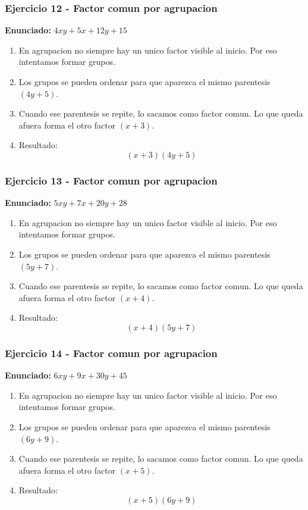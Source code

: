 \documentclass[11pt,a4paper]{article}
\begin{document}
\vspace{0.2cm}
\subsubsection*{Ejercicio 12 - Factor comun por agrupacion}
\textbf{Enunciado:} $ 4 x y + 5 x + 12 y + 15 $\par
\begin{enumerate}[leftmargin=2em]
\item En agrupacion no siempre hay un unico factor visible al inicio. Por eso intentamos formar grupos.
\item Los grupos se pueden ordenar para que aparezca el mismo parentesis \((4 y + 5)\).
\item Cuando ese parentesis se repite, lo sacamos como factor comun. Lo que queda afuera forma el otro factor \((x + 3)\).
\item Resultado: \[\boxed{\left(x + 3\right)\left(4 y + 5\right)}\]
\end{enumerate}

\vspace{0.2cm}
\subsubsection*{Ejercicio 13 - Factor comun por agrupacion}
\textbf{Enunciado:} $ 5 x y + 7 x + 20 y + 28 $\par
\begin{enumerate}[leftmargin=2em]
\item En agrupacion no siempre hay un unico factor visible al inicio. Por eso intentamos formar grupos.
\item Los grupos se pueden ordenar para que aparezca el mismo parentesis \((5 y + 7)\).
\item Cuando ese parentesis se repite, lo sacamos como factor comun. Lo que queda afuera forma el otro factor \((x + 4)\).
\item Resultado: \[\boxed{\left(x + 4\right)\left(5 y + 7\right)}\]
\end{enumerate}

\vspace{0.2cm}
\subsubsection*{Ejercicio 14 - Factor comun por agrupacion}
\textbf{Enunciado:} $ 6 x y + 9 x + 30 y + 45 $\par
\begin{enumerate}[leftmargin=2em]
\item En agrupacion no siempre hay un unico factor visible al inicio. Por eso intentamos formar grupos.
\item Los grupos se pueden ordenar para que aparezca el mismo parentesis \((6 y + 9)\).
\item Cuando ese parentesis se repite, lo sacamos como factor comun. Lo que queda afuera forma el otro factor \((x + 5)\).
\item Resultado: \[\boxed{\left(x + 5\right)\left(6 y + 9\right)}\]
\end{enumerate}
\end{document}
